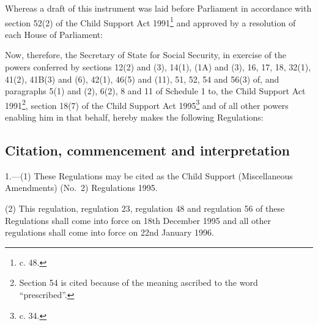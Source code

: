 \documentclass[12pt,a4paper]{article}
\title{\regstitle}
\author{S.I. 1995 No. 3261}
\date{Made 15th December 1995\\Coming into force:\\Regulations 1, 23, 48 and 56 18th December 1995\\Remainder 22nd January 1996}
\begin{document}
\maketitle

\noindent
Whereas a draft of this instrument was laid before Parliament in accordance with section 52(2) of the Child Support Act 1991\footnote{ c. 48.} and approved by a resolution of each House of Parliament:

 Now, therefore, the Secretary of State for Social Security, in exercise of the powers conferred by sections 12(2) and (3), 14(1), (1A) and (3), 16, 17, 18, 32(1), 41(2), 41B(3) and (6), 42(1), 46(5) and (11), 51, 52, 54 and 56(3) of, and paragraphs 5(1) and (2), 6(2), 8 and 11 of Schedule 1 to, the Child Support Act 1991\footnote{\frenchspacing Section 54 is cited because of the meaning ascribed to the word “prescribed”.}, section 18(7) of the Child Support Act 1995\footnote{ c. 34.} and of all other powers enabling him in that behalf, hereby makes the following Regulations:

{\sloppy

\tableofcontents

}

\setcounter{secnumdepth}{-2}

\subsection[1. Citation, commencement and interpretation]{Citation, commencement and interpretation}

1.—(1) These Regulations may be cited as the Child Support (Miscellaneous Amendments) (No.\ 2) Regulations 1995.

(2) This regulation, regulation 23, regulation 48 and regulation 56 of these Regulations shall come into force on 18th December 1995 and all other regulations shall come into force on 22nd January 1996.
\end{document}
